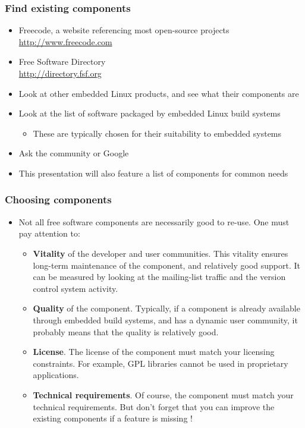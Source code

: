 \begin{frame}
  \frametitle{Find existing components}
  \begin{itemize}
  \item Freecode, a website referencing most open-source projects\\
    \url{http://www.freecode.com}
  \item Free Software Directory\\
    \url{http://directory.fsf.org}
  \item Look at other embedded Linux products, and see what their
    components are
  \item Look at the list of software packaged by embedded Linux build
    systems
    \begin{itemize}
    \item These are typically chosen for their suitability to embedded
      systems
    \end{itemize}
  \item Ask the community or Google
  \item This presentation will also feature a list of components for
    common needs
  \end{itemize}
\end{frame}

\begin{frame}
  \frametitle{Choosing components}
  \begin{itemize}
  \item Not all free software components are necessarily good to
    re-use. One must pay attention to:
    \begin{itemize}
    \item {\bf Vitality} of the developer and user communities. This
      vitality ensures long-term maintenance of the component, and
      relatively good support. It can be measured by looking at the
      mailing-list traffic and the version control system activity.
    \item {\bf Quality} of the component. Typically, if a component is
      already available through embedded build systems, and has a
      dynamic user community, it probably means that the quality is
      relatively good.
    \item {\bf License}. The license of the component must match your
      licensing constraints. For example, GPL libraries cannot be used
      in proprietary applications.
    \item {\bf Technical requirements}. Of course, the component must
      match your technical requirements. But don't forget that you can
      improve the existing components if a feature is missing !
    \end{itemize}
  \end{itemize}
\end{frame}

